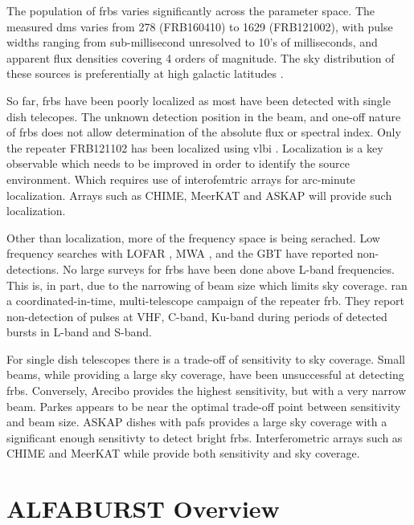 \documentclass[a4paper,fleqn,usenatbib]{mnras}
\begin{document}
The population of \glspl{frb} varies significantly across the parameter space.
The measured \glspl{dm} varies from 278 (FRB160410) to 1629 (FRB121002), with
pulse widths ranging from sub-millisecond unresolved to 10's of milliseconds,
and apparent flux densities covering 4 orders of magnitude. The sky distribution
of these sources is preferentially at high galactic latitudes
\citep{2015MNRAS.451.3278M}.

So far, \glspl{frb} have been poorly localized as most have been detected with
single dish telecopes. The unknown detection position in the beam, and one-off
nature of \glspl{frb} does not allow determination of the absolute flux or
spectral index. Only the repeater FRB121102 has been localized using \gls{vlbi}
\citep{2017ApJ...834L...8M, 2017ApJ...834L...7T}. Localization is a key
observable which needs to be improved in order to identify the source
environment. Which requires use of interofemtric arrays for arc-minute
localization. Arrays such as CHIME, MeerKAT and ASKAP will provide such
localization.

Other than localization, more of the frequency space is being serached. Low
frequency searches with LOFAR \citep{2015MNRAS.452.1254K}, MWA
\citep{2015AJ....150..199T}, and the GBT \citep{2017arXiv170107457C} have
reported non-detections.  No large surveys for \glspl{frb} have been done above
L-band frequencies. This is, in part, due to the narrowing of beam size which
limits sky coverage.  \cite{2017arXiv170507553L} ran a coordinated-in-time,
multi-telescope campaign of the repeater \gls{frb}.  They report non-detection
of pulses at VHF, C-band, Ku-band during periods of detected bursts in L-band
and S-band.

For single dish telescopes there is a trade-off of sensitivity to sky coverage.
Small beams, while providing a large sky coverage, have been unsuccessful at
detecting \glspl{frb}. Conversely, Arecibo provides the highest sensitivity, but
with a very narrow beam. Parkes appears to be near the optimal trade-off point
between sensitivity and beam size.  ASKAP dishes with \glspl{paf} provides a
large sky coverage with a significant enough sensitivty to detect bright
\glspl{frb}. Interferometric arrays such as CHIME and MeerKAT while provide both
sensitivity and sky coverage.

\section{ALFABURST Overview}
\label{sec:overview}
\end{document}
